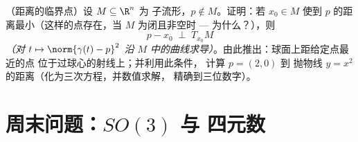 \begin{exercise}[$\star\star$]\label{exo:b3:submanifolds:12}
（距离的临界点）设 $M \subseteq \R^n$ 为
子流形，$p \notin M$。证明：若 $x_0 \in M$
使到 $p$ 的距离最小（这样的点存在，当 $M$
为闭且非空时 --- 为什么？），则
\[
p - x_0 \;\perp\; T_{x_0}M
\]
\emph{（对 $t \mapsto \norm{\gamma(t) - p}^2$ 沿
$M$ 中的曲线求导）}。由此推出：球面上距给定点最近的点
位于过球心的射线上；并利用此条件，
计算 $p = (2, 0)$ 到
抛物线 $y = x^2$ 的距离（化为三次方程，并数值求解，
精确到三位数字）。
\end{exercise}

\section{周末问题：\texorpdfstring{$SO(3)$}{SO(3)} 与
四元数}

